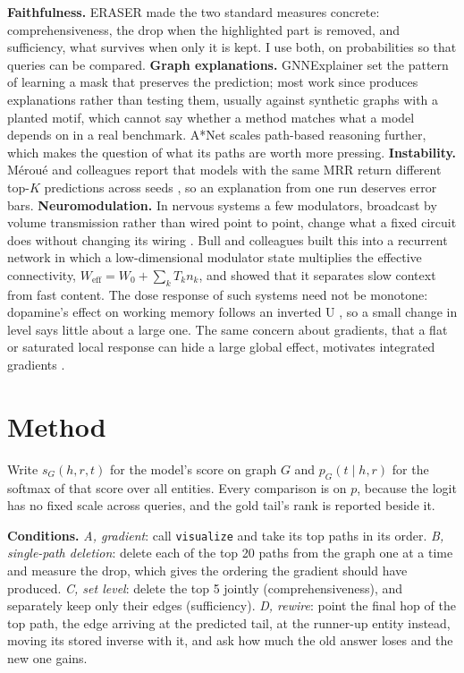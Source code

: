 \documentclass[10pt,twocolumn,letterpaper]{article}
\begin{document}
\textbf{Faithfulness.} ERASER \cite{eraser} made the two standard measures
concrete: comprehensiveness, the drop when the highlighted part is removed, and
sufficiency, what survives when only it is kept. I use both, on probabilities
so that queries can be compared. \textbf{Graph explanations.} GNNExplainer
\cite{gnnexplainer} set the pattern of learning a mask that preserves the
prediction; most work since produces explanations rather than testing them,
usually against synthetic graphs with a planted motif, which cannot say
whether a method matches what a model depends on in a real benchmark. A*Net
\cite{astar} scales path-based reasoning further, which makes the question of
what its paths are worth more pressing. \textbf{Instability.} M\'erou\'e and
colleagues report that models with the same MRR return different top-\(K\)
predictions across seeds \cite{instability}, so an explanation from one run
deserves error bars. \textbf{Neuromodulation.} In nervous systems a few
modulators, broadcast by volume transmission rather than wired point to point,
change what a fixed circuit does without changing its wiring
\cite{marder2012}. Bull and colleagues \cite{bull2025volume} built this into a
recurrent network in which a low-dimensional modulator state multiplies the
effective connectivity, \(W_{\mathrm{eff}} = W_0 + \sum_k T_k n_k\), and showed
that it separates slow context from fast content. The dose response of such
systems need not be monotone: dopamine's effect on working memory follows an
inverted U \cite{cools2011}, so a small change in level says little about a
large one. The same concern about gradients, that a flat or saturated local
response can hide a large global effect, motivates integrated gradients
\cite{ig}.

\section{Method}

Write \(s_G(h,r,t)\) for the model's score on graph \(G\) and
\(p_G(t \mid h, r)\) for the softmax of that score over all entities. Every
comparison is on \(p\), because the logit has no fixed scale across queries,
and the gold tail's rank is reported beside it.

\textbf{Conditions.} \emph{A, gradient}: call \texttt{visualize} and take its
top paths in its order. \emph{B, single-path deletion}: delete each of the top
20 paths from the graph one at a time and measure the drop, which gives the
ordering the gradient should have produced. \emph{C, set level}: delete the top
5 jointly (comprehensiveness), and separately keep only their edges
(sufficiency). \emph{D, rewire}: point the final hop of the top path, the edge
arriving at the predicted tail, at the runner-up entity instead, moving its
stored inverse with it, and ask how much the old answer loses and the new one
gains.
\end{document}
